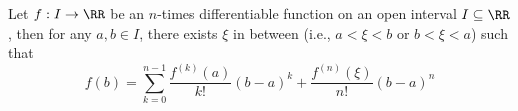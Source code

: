 

\begin{proposition}
Let $f: I\to\RR$ be an $n$-times differentiable function on an open 
interval $I\subseteq\RR$, then for any $a,b\in I$, there exists 
$\xi$ in between (i.e., $a<\xi<b$ or $b<\xi<a$) such that
$$
f(b) = \sum_{k=0}^{n-1} \frac{f^{(k)}(a)}{k!}(b-a)^k + 
\frac{f^{(n)}(\xi)}{n!}(b-a)^n
$$
\end{proposition}

